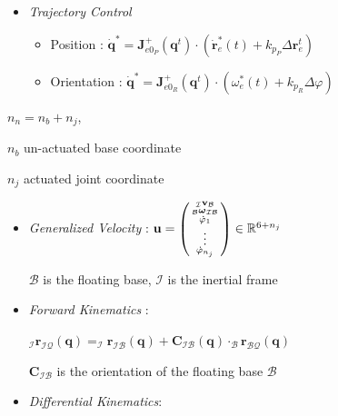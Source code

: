 \documentclass[landscape,a0paper,fontscale=0.285]{baposter} %
\newcommand{\compresslist}{ %
\setlength{\itemsep}{1pt}
\setlength{\parskip}{0pt}
\setlength{\parsep}{0pt}
}
\renewenvironment{pmatrix}{\left(\begin{smallmatrix}}{\end{smallmatrix}\right)}
\begin{document}
\begin{poster}
{\begin{itemize}
    \item \textit{Trajectory Control} 
        \begin{itemize}[label=$\circ$]\compresslist
            \item Position : $\dot{\mathbf{q}}^* = \mathbf{J}^+_{e0_P}(\mathbf{q}^t)\cdot (\dot{\mathbf{r}}_e^*(t) + k_{p_P}\Delta \mathbf{r}_e^t)$

            \item Orientation : $\dot{\mathbf{q}}^* = \mathbf{J}_{e0_R}^+(\mathbf{q}^t)\cdot (\omega_e^*(t)+k_{p_R}\Delta \varphi)$
        \end{itemize}
      
\end{itemize}

\colorbox[HTML]{CCFFFF}{}

 $n_n=n_b+n_j$, 
 
 $n_b$ un-actuated base coordinate 
 
 $n_j$ actuated joint coordinate

\begin{itemize}\compresslist
    \item \textit{Generalized Velocity} : $\mathbf{u} =  \begin{pmatrix}_{\mathcal{I}}\mathbf{v}_{\mathcal{B}}\\_{\mathcal{B}}\boldsymbol{\omega}_{\mathcal{IB}}\\\dot{\varphi}_1\\\vdots \\ \dot{\varphi}_{n_j}\end{pmatrix} \in \mathbb{R}^{6+n_j}$ 
    
    $\mathcal{B}$ is the floating base, $\mathcal{I}$ is the inertial frame
    \item \textit{Forward Kinematics} : 
    
    $_{\mathcal{I}}\mathbf{r}_{\mathcal{IQ}}(\mathbf{q}) = _{\mathcal{I}}\mathbf{r}_{\mathcal{IB}}(\mathbf{q}) + \mathbf{C}_{\mathcal{IB}}(\mathbf{q})\cdot_{\mathcal{B}}\mathbf{r}_{\mathcal{BQ}}(\mathbf{q})$ 
    
    $\mathbf{C}_{\mathcal{IB}}$ is the orientation of the floating base $\mathcal{B}$
    \item \textit{Differential Kinematics}: 
    

\end{itemize}}
\end{poster}
\end{document}
